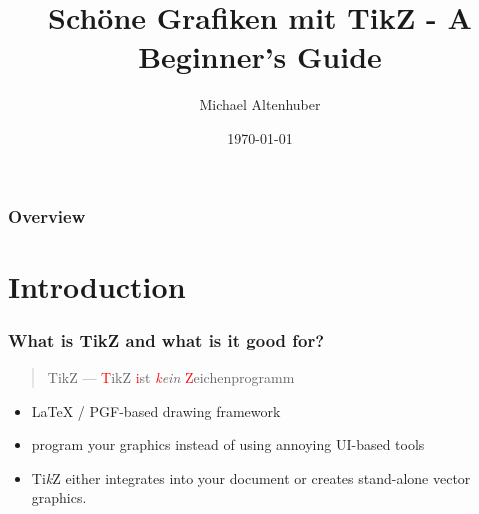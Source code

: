 \documentclass{beamer}
\title[TikZ - Beginner's Guide]{Schöne Grafiken mit TikZ - A Beginner's Guide} %
\author{Michael Altenhuber} %
\institute[FH-LUG] %
{
FH-LUG \\ %
\medskip
\textit{michael@altenhuber.net} %
}
\date{\today} %
\newcommand{\tikzname}{Ti\textit{k}Z\xspace}
\begin{document}
\begin{frame}
\titlepage %
\end{frame}

\begin{frame}
\frametitle{Overview} %
\tableofcontents %
\end{frame}


\section{Introduction} %

\begin{frame}
\frametitle{What is TikZ and what is it good for?}

\begin{quote}
    TikZ --- \textcolor{red}{T}ikZ \textcolor{red}{i}st \textit{\textcolor{red}{k}ein} \textcolor{red}{Z}eichenprogramm
\end{quote}

\begin{itemize}
    \item \LaTeX{} / PGF-based drawing framework
    \item program your graphics instead of using annoying UI-based tools
    \item \tikzname either integrates into your document or creates stand-alone vector graphics.
\end{itemize}

\end{frame}
\end{document}
